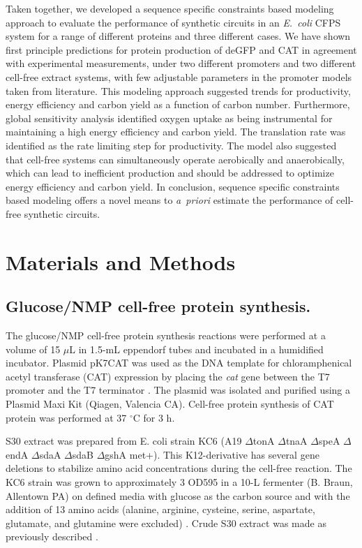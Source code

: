 \documentclass[journal=asbcd6,manuscript=article]{achemso}
\begin{document}
Taken together, we developed a sequence specific constraints based modeling approach to evaluate the performance of synthetic circuits in an \emph{E.~coli} CFPS system for a range of different proteins and three different cases.
We have shown first principle predictions for protein production of deGFP and CAT in agreement with experimental measurements, under two different promoters and two different cell-free extract systems, with few adjustable parameters in the promoter models taken from literature.
This modeling approach suggested trends for productivity, energy efficiency and carbon yield as a function of carbon number.
Furthermore, global sensitivity analysis identified oxygen uptake as being instrumental for maintaining a high energy efficiency and carbon yield.
The translation rate was identified as the rate limiting step for productivity.
The model also suggested that cell-free systems can simultaneously operate aerobically and anaerobically, which can lead to inefficient production and should be addressed to optimize energy efficiency and carbon yield.
In conclusion, sequence specific constraints based modeling offers a novel means to \emph{a~priori} estimate the performance of cell-free synthetic circuits.

\clearpage

\section*{Materials and Methods}

\subsection*{Glucose/NMP cell-free protein synthesis.}
The glucose/NMP cell-free protein synthesis reactions were performed at a volume of 15 $\mu$L in 1.5-mL eppendorf tubes and incubated in a humidified incubator.
Plasmid pK7CAT was used as the DNA template for chloramphenical acetyl transferase (CAT) expression by placing the \emph{cat} gene between the T7 promoter and the T7 terminator \cite{Kigawa1995}.
The plasmid was isolated and purified using a Plasmid Maxi Kit (Qiagen, Valencia CA).
Cell-free protein synthesis of CAT protein was performed at 37 $^{\circ}$C for 3 h.

S30 extract was prepared from E. coli strain KC6 (A19 $\Delta$tonA $\Delta$tnaA $\Delta$speA $\Delta$endA $\Delta$sdaA $\Delta$sdaB $\Delta$gshA met+).
This K12-derivative has several gene deletions to stabilize amino acid concentrations during the cell-free reaction.
The KC6 strain was grown to approximately 3 OD595 in a 10-L fermenter (B. Braun, Allentown PA) on defined media with glucose as the carbon source and with the addition of 13 amino acids (alanine, arginine, cysteine, serine, aspartate, glutamate, and glutamine were excluded) \cite{Zawada:2003}.
Crude S30 extract was made as previously described \cite{Jewett:2002}.
\end{document}
